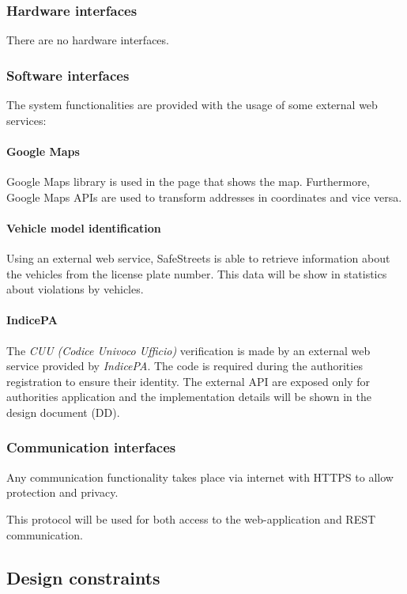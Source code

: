 \subsubsection{Hardware interfaces}
There are no hardware interfaces.

\subsubsection{Software interfaces}
The system functionalities are provided with the usage of some external web services:

\paragraph{Google Maps}
Google Maps library is used in the page that shows the map.
Furthermore, Google Maps APIs are used to transform addresses in coordinates and vice versa.


\paragraph{Vehicle model identification}
Using an external web service, SafeStreets is able to retrieve information about the vehicles from the license plate number.
This data will be show in statistics about violations by vehicles.

\paragraph{IndicePA}
The \textit{CUU (Codice Univoco Ufficio)} verification is made by an external web service provided by \textit{IndicePA}. The code is required during the authorities registration to ensure their identity.
The external API are exposed only for authorities application and the implementation details will be shown in the design document (DD).


\subsubsection{Communication interfaces}
Any communication functionality takes place via internet with HTTPS to allow protection and privacy.

This protocol will be used for both access to the web-application and REST communication.
\newpage
\subsection{Design constraints}
